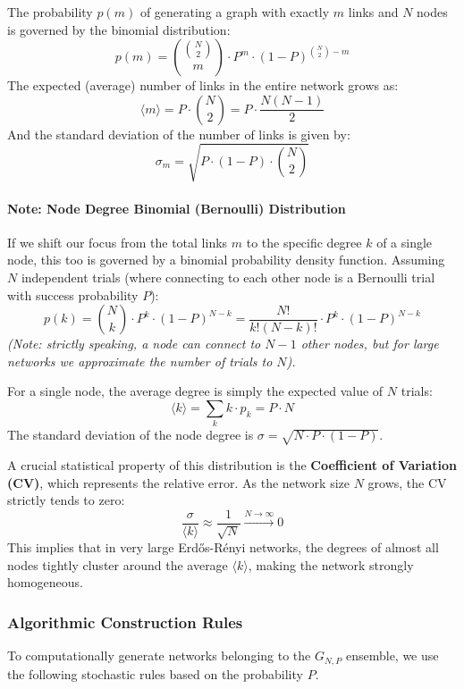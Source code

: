 The probability \( p(m) \) of generating a graph with exactly \( m \) links and \( N \) nodes is governed by the binomial distribution:
\[
    p(m) = \binom{\binom{N}{2}}{m} \cdot P^m \cdot (1 - P)^{\binom{N}{2} - m}
\]
The expected (average) number of links in the entire network grows as:
\[
    \langle m \rangle = P \cdot \binom{N}{2} = P \cdot \frac{N(N-1)}{2}
\]
And the standard deviation of the number of links is given by:
\[
    \sigma_m = \sqrt{P \cdot (1 - P) \cdot \binom{N}{2}}
\]

\paragraph{Note: Node Degree Binomial (Bernoulli) Distribution}
If we shift our focus from the total links \( m \) to the specific degree \( k \) of a single node, this too is governed by a binomial probability density function. Assuming \( N \) independent trials (where connecting to each other node is a Bernoulli trial with success probability \( P \)):
\[
    p(k) = \binom{N}{k} \cdot P^k \cdot (1 - P)^{N-k} = \frac{N!}{k!(N - k)!} \cdot P^k \cdot (1 - P)^{N-k}
\]
\textit{(Note: strictly speaking, a node can connect to \( N-1 \) other nodes, but for large networks we approximate the number of trials to \( N \)).}

For a single node, the average degree is simply the expected value of \( N \) trials:
\[
    \langle k \rangle = \sum_k k \cdot p_k = P \cdot N
\]
The standard deviation of the node degree is \( \sigma = \sqrt{N \cdot P \cdot (1 - P)} \).

A crucial statistical property of this distribution is the \textbf{Coefficient of Variation (CV)}, which represents the relative error. As the network size \( N \) grows, the CV strictly tends to zero:
\[
    \frac{\sigma}{\langle k \rangle} \approx \frac{1}{\sqrt{N}} \xrightarrow{N \to \infty} 0
\]
This implies that in very large Erdős-Rényi networks, the degrees of almost all nodes tightly cluster around the average \( \langle k \rangle \), making the network strongly homogeneous.

\subsubsection{Algorithmic Construction Rules}

To computationally generate networks belonging to the \( G_{N,P} \) ensemble, we use the following stochastic rules based on the probability \( P \).

